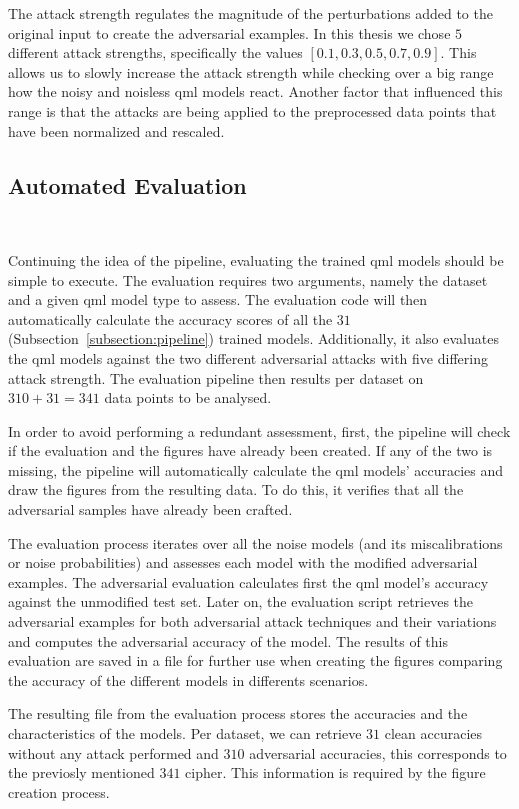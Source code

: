 The attack strength regulates the magnitude of the perturbations
added to the original input to create the adversarial examples. 
In this thesis we chose \(5\) different attack strengths,
specifically the values \(\left[0.1, 0.3, 0.5, 0.7, 0.9\right]\).
This allows us to slowly increase the attack strength while
checking over a big range how the noisy and noisless \ac{qml}
models react. Another factor that influenced this range is that
the attacks are being applied to the preprocessed data points
that have been normalized and rescaled. \

\subsection{Automated Evaluation}\label{subsection:evaluation} \

Continuing the idea of the pipeline, evaluating the trained
\ac{qml} models should be simple to execute. The evaluation
requires two arguments, namely the dataset and a given \ac{qml}
model type to assess. The evaluation code will then
automatically calculate the accuracy scores of all the \(31\)
(Subsection~\ref{subsection:pipeline}) trained models. Additionally,
it also evaluates the \ac{qml} models against the two different
adversarial attacks with five differing attack strength.
The evaluation pipeline then results per dataset on \(310 + 31 = 341\)
data points to be analysed. \

In order to avoid performing a redundant assessment, first,
the pipeline will check if the evaluation and the figures
have already been created. If any of the two is missing,
the pipeline will automatically calculate the \ac{qml} models'
accuracies and draw the figures from the resulting data. To
do this, it verifies that all the adversarial samples have
already been crafted. \

The evaluation process iterates over all the noise
models (and its miscalibrations or noise probabilities)
and assesses each model with the modified adversarial
examples. The adversarial evaluation calculates first the
\ac{qml} model's accuracy against the unmodified test set.
Later on, the evaluation script retrieves the adversarial
examples for both adversarial attack techniques and their
variations and computes the adversarial accuracy of the model.
The results of this evaluation are saved in a file
for further use when creating the figures comparing the
accuracy of the different models in differents scenarios. \

The resulting file from the evaluation process stores the
accuracies and the characteristics of the models. Per dataset,
we can retrieve \(31\) clean accuracies without any attack
performed and \(310\) adversarial accuracies, this corresponds
to the previosly mentioned \(341\) cipher. This information
is required by the figure creation process. \

